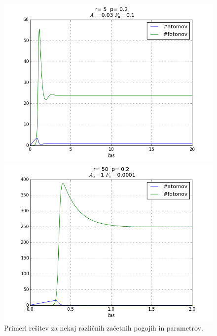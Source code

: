 \documentclass[slovene,11pt,a4paper]{article}
\numberwithin{equation}{section} %
\numberwithin{figure}{section} %
\numberwithin{table}{section} %
\begin{document}
\begin{figure}[h]
{\begin{minipage}[t]{0.5\paperwidth}
\begin{flushleft}
\includegraphics[scale=0.5]{slike/r=_5__p=_0_2___A_0=_0_03__F_0=_0_1.png}
\hspace{\fill}
\end{flushleft}
\end{minipage}
\begin{minipage}[t]{0.5\paperwidth}
\includegraphics[scale=0.5]{slike/r=_50__p=_0_2___A_0=_1__F_0=_0_0001.png}
\end{minipage}%
}
\caption{Primeri rešitev za nekaj različnih začetnih pogojih in parametrov.}
\label{resitve-graf-laser-osnovne}
\end{figure}
\pagebreak
\end{document}
